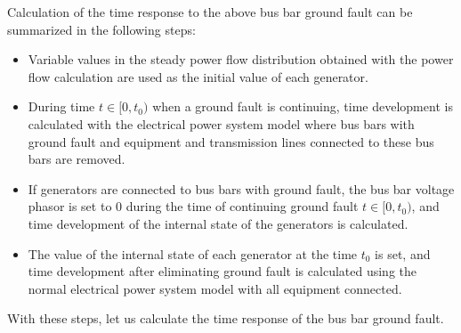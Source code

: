 \documentclass[tombow,dvipdfmx]{corona-a5-1.1}
\begin{document}
Calculation of the time response to the above bus bar ground fault can be summarized in the following steps:

\medskip
\begin{breakbox}
\begin{itemize}
\item[(a)] Variable values in the steady power flow distribution obtained with the power flow calculation are used as the initial value of each generator. 
\item[(b)] During time $ t \in [0, t_0)$ when a ground fault is continuing, time development is calculated with the electrical power system model where bus bars with ground fault and equipment and transmission lines connected to these bus bars are removed.
\item[(c)] If generators are connected to bus bars with ground fault, the bus bar voltage phasor is set to 0 during the time of continuing ground fault $ t \in [0, t_0)$, and time development of the internal state of the generators is calculated.
\item[(d)] The value of the internal state of each generator at the time $t_0$ is set, and time development after eliminating ground fault is calculated using the normal electrical power system model with all equipment connected. 
\end{itemize}
\end{breakbox}
\medskip


With these steps, let us calculate the time response of the bus bar ground fault.
\end{document}

